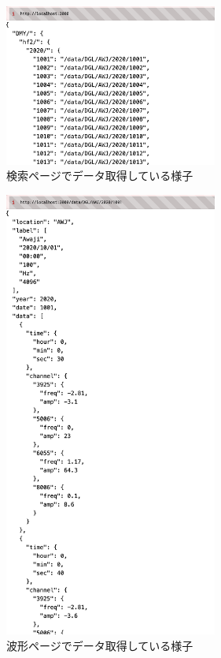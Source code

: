 \begin{figure}[htbp]
	\begin{center}
		\includegraphics[width=70mm]{./images/search-page-image.png}
		\caption{検索ページでデータ取得している様子}\label{fig:search-page-image}
	\end{center}
\end{figure}

\begin{figure}[htbp]
	\begin{center}
		\includegraphics[width=70mm]{./images/wave-page-image.png}
		\caption{波形ページでデータ取得している様子}\label{fig:wave-page-image}
	\end{center}
\end{figure}

